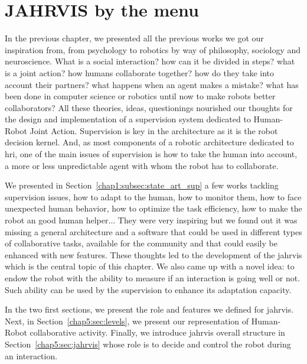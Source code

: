 \documentclass[a4paper,11pt,twoside]{StyleThese}
\begin{document}
	\setcounter{chapter}{4} %
	\dominitoc
	\faketableofcontents
	\fi

\chapter{JAHRVIS by the menu}
\label{chapter:chap5}
\minitoc

In the previous chapter, we presented all the previous works we got our inspiration from, from psychology to robotics by way of philosophy, sociology and neuroscience. What is a social interaction? how can it be divided in steps? what is a joint action? how humans collaborate together? how do they take into account their partners? what happens when an agent makes a mistake? what has been done in computer science or robotics until now to make robots better collaborators? All these theories, ideas, questionings nourished our thoughts for the design and implementation of a supervision system dedicated to Human-Robot Joint Action. Supervision is key in the architecture as it is the robot decision kernel. And, as most components of a robotic architecture dedicated to \acrshort{hri}, one of the main issues of supervision is how to take the human into account, a more or less unpredictable agent with whom the robot has to collaborate. 

We presented in Section~\ref{chap1:subsec:state_art_sup} a few works tackling supervision issues, \ie how to adapt to the human, how to monitor them, how to face unexpected human behavior, how to optimize the task efficiency, how to make the robot an good human helper... They were very inspiring but we found out it was missing a general architecture and a software that could be used in different types of collaborative tasks, available for the community and that could easily be enhanced with new features. These thoughts led to the development of the \acrfull{jahrvis} which is the central topic of this chapter. We also came up with a novel idea: to endow the robot with the ability to measure if an interaction is going well or not. Such ability can be used by the supervision to enhance its adaptation capacity.

In the two first sections, we present the role and features we defined for \acrshort{jahrvis}. Next, in Section~\ref{chap5:sec:levels}, we present our representation of Human-Robot collaborative activity. Finally, we introduce \acrshort{jahrvis} overall structure in Section~\ref{chap5:sec:jahrvis} whose role is to decide and control the robot during an interaction.
\end{document}
